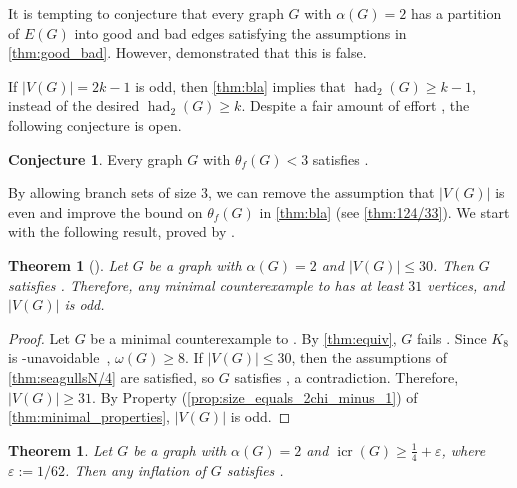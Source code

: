 \documentclass[11pt]{article}
\numberwithin{equation}{section}
\theoremstyle{plain}
\newtheorem{thm}[equation]{Theorem}
\theoremstyle{definition}
\newtheorem{conj}[thm]{Conjecture}
\renewcommand{\geq}{\geqslant}
\renewcommand{\leq}{\leqslant}
\DeclareMathOperator{\had}{had}
\DeclareMathOperator{\icr}{icr}
\newcommand{\propref}[1]{\textup{(\ref{#1})}}
\begin{document}
It is tempting to conjecture that every graph $G$ with $\alpha(G) = 2$ has a partition of $E(G)$ into good and bad edges satisfying the assumptions in \cref{thm:good_bad}. However, \citet{Blasiak07} demonstrated that this is false.

If $|V(G)| = 2k - 1$ is odd, then \cref{thm:bla} implies that $\had_2(G) \geq k-1$, instead of the desired $\had_2(G) \geq k$. Despite a fair amount of effort \citep{CS12}, the following conjecture is open.
\begin{conj}
    \label{conj:bla}
    Every graph $G$ with $\theta_f(G) < 3$ satisfies .
\end{conj}
By allowing branch sets of size $3$, we can remove the assumption that $|V(G)|$ is even and improve the bound on $\theta_f(G)$ in \cref{thm:bla} (see \cref{thm:124/33}). We start with the following result, proved by \citet{Carter22}.
\begin{thm}[\citet{Carter22}]
    \label{thm:carter30}
    Let $G$ be a graph with $\alpha(G) = 2$ and $|V(G)| \leq 30$. Then $G$ satisfies . Therefore, any minimal counterexample to  has at least $31$ vertices, and $|V(G)|$ is odd.
\end{thm}
\begin{proof}
    Let $G$ be a minimal counterexample to . By \cref{thm:equiv}, $G$ fails .
    Since     $K_8$ is -unavoidable~\citep{Carter22}, $\omega(G) \geq 8$. If $|V(G)| \leq 30$, then the assumptions of \cref{thm:seagullsN/4} are satisfied, so $G$ satisfies  , a contradiction. Therefore, $|V(G)| \geq 31$. By Property \propref{prop:size_equals_2chi_minus_1} of \cref{thm:minimal_properties}, $|V(G)|$ is odd.
\end{proof}
\begin{thm}
    \label{thm:icr1/4}
    Let $G$ be a graph with $\alpha(G) = 2$ and $\icr(G) \geq \frac{1}{4}  + \varepsilon$, where $\varepsilon:=1/62$. Then any inflation of $G$ satisfies .
\end{thm}
\end{document}
